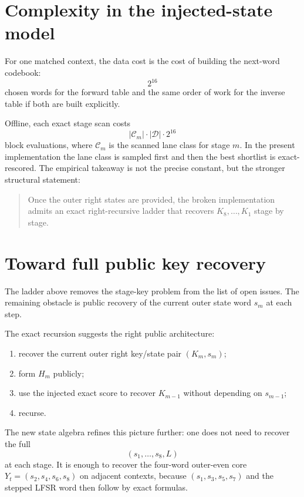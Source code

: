 \documentclass[11pt]{article}
\begin{document}
\section{Complexity in the injected-state model}
For one matched context, the data cost is the cost of building the next-word codebook:
\[
2^{16}
\]
chosen words for the forward table and the same order of work for the inverse table if both are built explicitly.

Offline, each exact stage scan costs
\[
|\mathcal{C}_m|\cdot |\mathcal{D}|\cdot 2^{16}
\]
block evaluations, where $\mathcal{C}_m$ is the scanned lane class for stage $m$. In the present implementation the lane class is sampled first and then the best shortlist is exact-rescored. The empirical takeaway is not the precise constant, but the stronger structural statement:

\begin{quote}
Once the outer right states are provided, the broken implementation admits an exact right-recursive ladder that recovers $K_8,\dots,K_1$ stage by stage.
\end{quote}

\section{Toward full public key recovery}
The ladder above removes the stage-key problem from the list of open issues. The remaining obstacle is public recovery of the current outer state word $s_m$ at each step.

The exact recursion suggests the right public architecture:
\begin{enumerate}[label=(\arabic*)]
\item recover the current outer right key/state pair $(K_m,s_m)$;
\item form $H_m$ publicly;
\item use the injected exact score to recover $K_{m-1}$ without depending on $s_{m-1}$;
\item recurse.
\end{enumerate}

The new state algebra refines this picture further: one does not need to recover the full
\[
(s_1,\dots,s_8,L)
\]
at each stage. It is enough to recover the four-word outer-even core $Y_t=(s_2,s_4,s_6,s_8)$ on adjacent contexts, because $(s_1,s_3,s_5,s_7)$ and the stepped LFSR word then follow by exact formulas.
\end{document}
